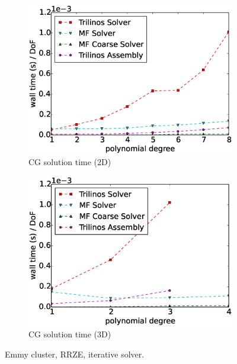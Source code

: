 \documentclass[times,doublespace]{nmeauth}
\begin{document}
\begin{figure}[!ht]
\begin{subfigure}[b]{0.49\textwidth}
    \label{fig:benchmark_miehe_Emmy_cg3}
  \end{subfigure}
  ~
  \begin{subfigure}[b]{0.49\textwidth}
    \centering
    \includegraphics[width=\textwidth]{Emmy_RRZE_solver2d.eps}
    \caption{CG solution time (2D)}
    \label{fig:benchmark_miehe_Emmy_sol2}
  \end{subfigure}
  \begin{subfigure}[b]{0.49\textwidth}
    \centering
    \includegraphics[width=\textwidth]{Emmy_RRZE_solver3d.eps}
    \caption{CG solution time (3D)}
    \label{fig:benchmark_miehe_Emmy_sol3}
  \end{subfigure}
  \caption{Emmy cluster, RRZE, iterative solver.}%
  \label{fig:benchmark_miehe_Emmy_cg}
\end{figure}
\end{document}
